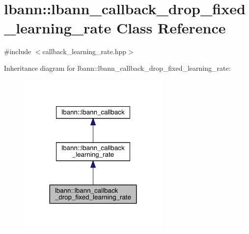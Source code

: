 \hypertarget{classlbann_1_1lbann__callback__drop__fixed__learning__rate}{}\section{lbann\+:\+:lbann\+\_\+callback\+\_\+drop\+\_\+fixed\+\_\+learning\+\_\+rate Class Reference}
\label{classlbann_1_1lbann__callback__drop__fixed__learning__rate}


{\ttfamily \#include $<$callback\+\_\+learning\+\_\+rate.\+hpp$>$}



Inheritance diagram for lbann\+:\+:lbann\+\_\+callback\+\_\+drop\+\_\+fixed\+\_\+learning\+\_\+rate\+:\nopagebreak
\begin{figure}[H]
\begin{center}
\leavevmode
\includegraphics[width=212pt]{classlbann_1_1lbann__callback__drop__fixed__learning__rate__inherit__graph}
\end{center}
\end{figure}


